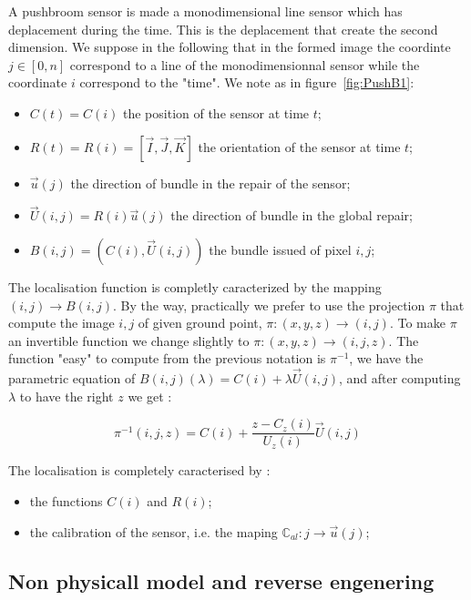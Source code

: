 A pushbroom sensor is made a monodimensional line sensor which has deplacement during the time.
This is the deplacement that create the second dimension. We suppose in the following  that in the
formed  image the coordinte $j \in [0,n] $ correspond to a line of the monodimensionnal sensor while the coordinate
$i$ correspond to the "time". We note as in figure~\ref{fig:PushB1}:

\begin{itemize}
	\item  $C(t)=C(i)$ the position of the sensor at time $t$;
	\item  $R(t)=R(i)=[\vec{I},\vec{J},\vec{K}]$ the orientation of the sensor at time $t$;
	\item  $\vec{u}(j)$ the direction of bundle in the repair of the sensor;
	\item  $\vec{U}(i,j) = R(i)\vec{u}(j)$ the direction of bundle in the global repair;
	\item  $B(i,j)= (C(i),\vec{U}(i,j))$ the bundle issued of pixel $i,j$;
\end{itemize}

The localisation function is completly caracterized by the mapping $(i,j) \rightarrow B(i,j)$.
By the way, practically we prefer to use the projection $\pi$ that  compute the 
image $i,j$ of given ground point, $\pi : (x,y,z) \rightarrow (i,j)$.  To make
$\pi$ an invertible function we change slightly to $\pi : (x,y,z) \rightarrow (i,j,z)$.
The function "easy" to compute from the previous notation is $\pi^{-1}$,
we have the parametric equation of $B(i,j)(\lambda) = C(i) + \lambda \vec{U}(i,j)$,
and after computing $\lambda$  to have the right $z$ we get :

\begin{equation}
	\pi^{-1}(i,j,z) = C(i) + \frac{z-C_z(i)}{U_z(i)} \vec{U}(i,j)  \label{PushB:EqPiM1}
\end{equation}

The localisation is completely caracterised by :

\begin{itemize}
	\item  the functions $C(i)$ and $R(i)$;
	\item  the calibration of the sensor, i.e. the maping $\mathbb{C}_{al} : j \rightarrow \vec{u}(j)$;
\end{itemize}


\subsection{Non physicall model and reverse engenering}


